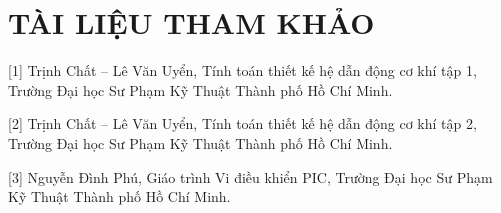\chapter*{TÀI LIỆU THAM KHẢO}
[1] Trịnh Chất – Lê Văn Uyển, Tính toán thiết kế hệ dẫn động cơ khí tập 1, Trường Đại học Sư Phạm Kỹ Thuật Thành phố Hồ Chí Minh.

[2] Trịnh Chất – Lê Văn Uyển, Tính toán thiết kế hệ dẫn động cơ khí tập 2, Trường Đại học Sư Phạm Kỹ Thuật Thành phố Hồ Chí Minh.

[3] Nguyễn Đình Phú, Giáo trình Vi điều khiển PIC, Trường Đại học Sư Phạm Kỹ Thuật Thành phố Hồ Chí Minh.
